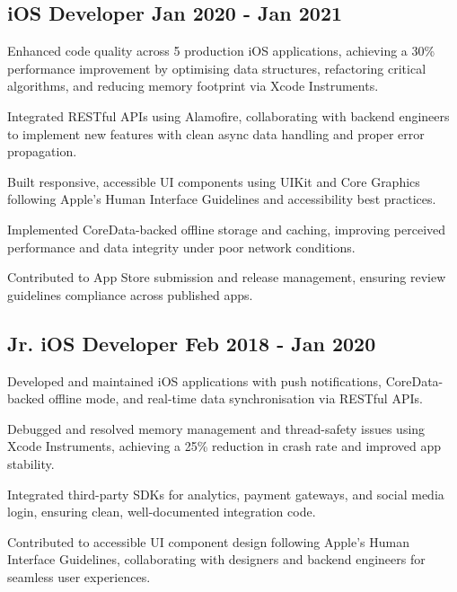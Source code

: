 \subsection{\texorpdfstring{iOS Developer \hfill Jan 2020 - Jan 2021}{iOS Developer}}
\begin{zitemize}
    \item Enhanced code quality across 5 production iOS applications, achieving a 30\% performance improvement by optimising data structures, refactoring critical algorithms, and reducing memory footprint via Xcode Instruments.
    \item Integrated RESTful APIs using Alamofire, collaborating with backend engineers to implement new features with clean async data handling and proper error propagation.
    \item Built responsive, accessible UI components using UIKit and Core Graphics following Apple's Human Interface Guidelines and accessibility best practices.
    \item Implemented CoreData-backed offline storage and caching, improving perceived performance and data integrity under poor network conditions.
    \item Contributed to App Store submission and release management, ensuring review guidelines compliance across published apps.
\end{zitemize}

\subsection{\texorpdfstring{Jr. iOS Developer \hfill Feb 2018 - Jan 2020}{Jr. iOS Developer}}
\begin{zitemize}
    \item Developed and maintained iOS applications with push notifications, CoreData-backed offline mode, and real-time data synchronisation via RESTful APIs.
    \item Debugged and resolved memory management and thread-safety issues using Xcode Instruments, achieving a 25\% reduction in crash rate and improved app stability.
    \item Integrated third-party SDKs for analytics, payment gateways, and social media login, ensuring clean, well-documented integration code.
    \item Contributed to accessible UI component design following Apple's Human Interface Guidelines, collaborating with designers and backend engineers for seamless user experiences.
\end{zitemize}
